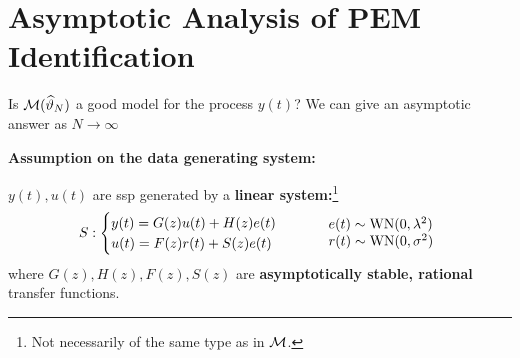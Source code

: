\section{Asymptotic Analysis of PEM Identification}

Is $\mathcal{M}(\widehat{\vartheta}_{N})$ a good model for the process $y(t)$?
We can give an asymptotic answer as $N\to \infty$

\textbf{Assumption on the data generating system:}

$y(t),u(t)$ are \gls{ssp} generated by a \textbf{linear system:}\footnote{Not necessarily of the same type as in $\mathcal{M}$.}
\[
	S:
	\begin{cases}
		y(t) = G(z)u(t) + H(z)e(t)\\
		u(t) = F(z)r(t) + S(z)e(t)
	\end{cases}
	\qquad
	\begin{array}{l}
		e(t)\sim \operatorname{WN}(0,\lambda^2)\\
		r(t)\sim \operatorname{WN}(0,\sigma^2)
	\end{array}
\]
where $G(z),H(z),F(z),S(z)$ are \textbf{asymptotically stable, rational} transfer functions.

